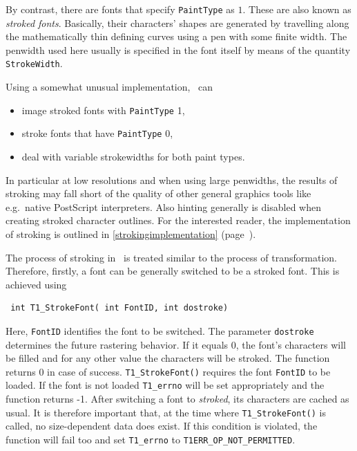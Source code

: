 By contrast, there are fonts that specify \verb+PaintType+ as $1$. These are
also known as {\em stroked fonts}. Basically, their characters' shapes are
generated by travelling along the mathematically thin defining curves using a
pen with some finite width. The penwidth used here usually is specified in the
font itself by means of the quantity \verb+StrokeWidth+. 

Using a somewhat unusual implementation, \tonelib\ can
\begin{itemize}
\item image stroked fonts with \verb+PaintType+ 1,
\item stroke fonts that have \verb+PaintType+ 0,
\item deal with variable strokewidths for both paint types.
\end{itemize}
In particular at low resolutions and when using large penwidths, the results
of stroking may fall short of the quality of other general graphics tools like
e.g.~native PostScript interpreters. Also hinting generally is disabled when
creating stroked character outlines. For the interested reader, the
implementation of stroking is outlined in \ref{strokingimplementation}
(page~\pageref{strokingimplementation}). 

The process of stroking in \tonelib\ is treated similar to the process of
transformation. Therefore, firstly, a font can be generally switched to be a
stroked font. This is achieved using 
\precorr
\begin{verbatim}
 int T1_StrokeFont( int FontID, int dostroke)
\end{verbatim}\postcorr
Here, \verb+FontID+ identifies the font to be switched. The parameter
\verb+dostroke+ determines the future rastering behavior. If it equals 0, the
font's characters will be filled and for any other value the characters will
be stroked. The function returns 0 in case of success.
\verb+T1_StrokeFont()+ requires the font \verb+FontID+ to be loaded. If the
font is not loaded \verb+T1_errno+ will be set appropriately and the function
returns -1. After switching a font to {\em stroked}, its characters are cached
as usual. It is therefore important that, at the time where
\verb+T1_StrokeFont()+ is called, no size-dependent data does exist. If this
condition is violated, the function will fail too and set \verb+T1_errno+ to 
\verb+T1ERR_OP_NOT_PERMITTED+.  

